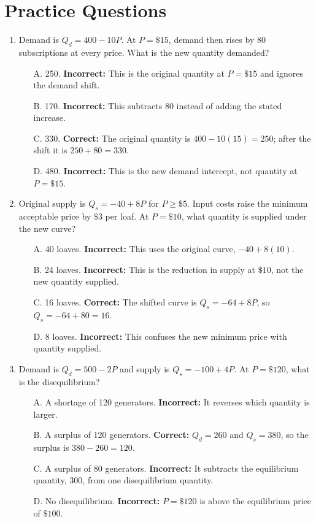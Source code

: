 \documentclass[11pt,letterpaper]{article}
\begin{document}
\section*{Practice Questions}
\begin{enumerate}
    \item Demand is $Q_d=400-10P$. At $P=\$15$, demand then rises by 80 subscriptions at every price. What is the new quantity demanded?
    \begin{itemize}
        \item[A.] 250. \textbf{Incorrect:} This is the original quantity at $P=\$15$ and ignores the demand shift.
        \item[B.] 170. \textbf{Incorrect:} This subtracts 80 instead of adding the stated increase.
        \item[C.] 330. \textbf{Correct:} The original quantity is $400-10(15)=250$; after the shift it is $250+80=330$.
        \item[D.] 480. \textbf{Incorrect:} This is the new demand intercept, not quantity at $P=\$15$.
    \end{itemize}

    \item Original supply is $Q_s=-40+8P$ for $P\ge\$5$. Input costs raise the minimum acceptable price by $\$3$ per loaf. At $P=\$10$, what quantity is supplied under the new curve?
    \begin{itemize}
        \item[A.] 40 loaves. \textbf{Incorrect:} This uses the original curve, $-40+8(10)$.
        \item[B.] 24 loaves. \textbf{Incorrect:} This is the reduction in supply at $\$10$, not the new quantity supplied.
        \item[C.] 16 loaves. \textbf{Correct:} The shifted curve is $Q_s=-64+8P$, so $Q_s=-64+80=16$.
        \item[D.] 8 loaves. \textbf{Incorrect:} This confuses the new minimum price with quantity supplied.
    \end{itemize}

    \item Demand is $Q_d=500-2P$ and supply is $Q_s=-100+4P$. At $P=\$120$, what is the disequilibrium?
    \begin{itemize}
        \item[A.] A shortage of 120 generators. \textbf{Incorrect:} It reverses which quantity is larger.
        \item[B.] A surplus of 120 generators. \textbf{Correct:} $Q_d=260$ and $Q_s=380$, so the surplus is $380-260=120$.
        \item[C.] A surplus of 80 generators. \textbf{Incorrect:} It subtracts the equilibrium quantity, 300, from one disequilibrium quantity.
        \item[D.] No disequilibrium. \textbf{Incorrect:} $P=\$120$ is above the equilibrium price of $\$100$.
    \end{itemize}


\end{enumerate}
\end{document}

